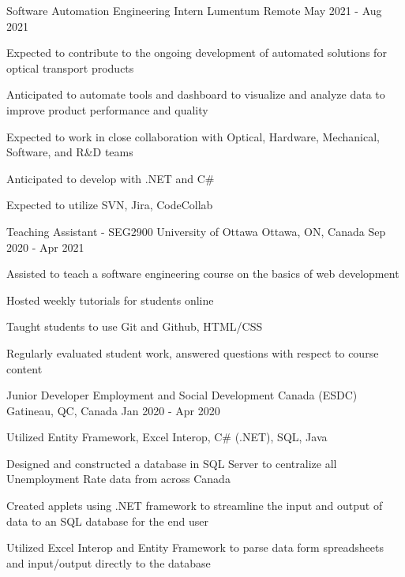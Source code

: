 
\begin{cventries}

  \cventry
    {Software Automation Engineering Intern} %
    {Lumentum} %
    {Remote} %
    {May 2021 - Aug 2021} %
    {
      \begin{cvitems} %
      \item Expected to contribute to the ongoing development of automated solutions for optical transport products
      \item Anticipated to automate tools and dashboard to visualize and analyze data to improve product performance and quality
      \item Expected to work in close collaboration with Optical, Hardware, Mechanical, Software, and R\&D teams
      \item Anticipated to develop with .NET and C\#
      \item Expected to utilize SVN, Jira, CodeCollab
      \end{cvitems}
    }
  \cventry
    {Teaching Assistant - SEG2900} %
    {University of Ottawa} %
    {Ottawa, ON, Canada} %
    {Sep 2020 - Apr 2021} %
    {
      \begin{cvitems} %
      \item Assisted to teach a software engineering course on the basics of web development
      \item Hosted weekly tutorials for students online
      \item Taught students to use Git and Github, HTML/CSS
      \item Regularly evaluated student work, answered questions with respect to course content
      \end{cvitems}
    }

  \cventry
    {Junior Developer} %
    {Employment and Social Development Canada (ESDC)} %
    {Gatineau, QC, Canada} %
    {Jan 2020 - Apr 2020} %
    {
      \begin{cvitems} %
      \item Utilized Entity Framework, Excel Interop, C\# (.NET), SQL, Java 
      \item Designed and constructed a database in SQL Server to centralize all Unemployment Rate data from across Canada
      \item Created applets using .NET framework to streamline the input and output of data to an SQL database for the end user
      \item Utilized Excel Interop and Entity Framework to parse data form spreadsheets and input/output directly to the database
      \end{cvitems}
    }


\end{cventries}
